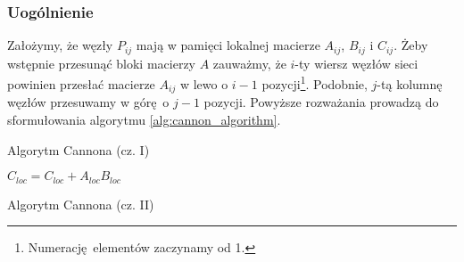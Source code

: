 \subsubsection{Uogólnienie}
Założymy, że węzły \(P_{ij}\) mają w pamięci lokalnej macierze \(A_{ij}\), \(B_{ij}\) i \(C_{ij}\). Żeby wstępnie przesunąć bloki macierzy \(A\) zauważmy, że \(i\)-ty wiersz węzłów sieci powinien przesłać macierze \(A_{ij}\) w lewo o \(i-1\) pozycji\footnote{Numerację elementów zaczynamy od 1.}. Podobnie, \(j\)-tą kolumnę węzłów przesuwamy w górę o \(j-1\) pozycji. Powyższe rozważania prowadzą do sformułowania algorytmu \ref{alg:cannon_algorithm}.


\begin{algorithm}[H]
\centering
\begin{algorithmic}[1]
\item[]
 
\end{algorithmic}
\caption{Algorytm Cannona\cite{Golub} (cz. I)}
\end{algorithm}

\begin{algorithm}[H]
\ContinuedFloat
\centering
\begin{algorithmic}[1]
\EndFor
{}
\EndFor
{} 
	\State \(C_{loc}=C_{loc} + A_{loc}B_{loc}\)
\EndFor
{} 
	 
\EndFor
{}
\EndFor
\end{algorithmic}
\caption{Algorytm Cannona\cite{Golub} (cz. II)}
\label{alg:cannon_algorithm}
\end{algorithm}

